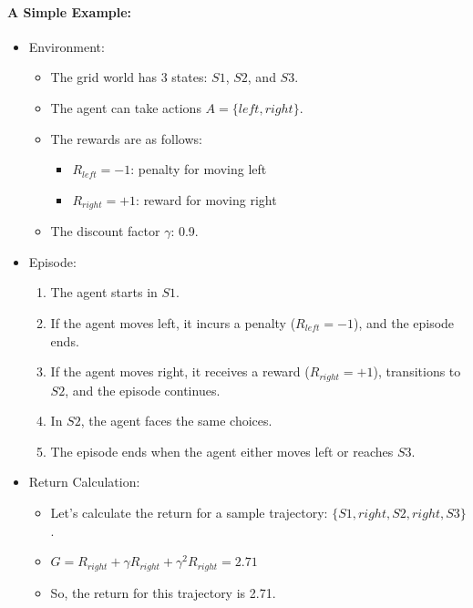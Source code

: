 \paragraph{A Simple Example:}
\begin{itemize}
	\item Environment:
		\begin{itemize}
			\item The grid world has 3 states: $S1$, $S2$, and $S3$.
			\item The agent can take actions $A=\{left,right\}$.
			\item The rewards are as follows:
				\begin{itemize}
					\item $R_{left}=-1$: penalty for moving left
					\item $R_{right}=+1$: reward for moving right
				\end{itemize}
			\item The discount factor $\gamma$: 0.9.
		\end{itemize}
	\item Episode:
		\begin{enumerate}
			\item The agent starts in $S1$.
			\item If the agent moves left, it incurs a penalty ($R_{left}=-1$), and the episode ends.
			\item If the agent moves right, it receives a reward ($R_{right}=+1$), transitions to $S2$, and the episode continues.
			\item In $S2$, the agent faces the same choices.
			\item The episode ends when the agent either moves left or reaches $S3$.
		\end{enumerate}
	\item Return Calculation:
		\begin{itemize}
			\item Let's calculate the return for a sample trajectory: $\{S1,right,S2,right,S3\}$.
			\item $G=R_{right}+\gamma R_{right}+\gamma^2R_{right}=2.71$ 
			\item So, the return for this trajectory is 2.71.
		\end{itemize}
\end{itemize}

